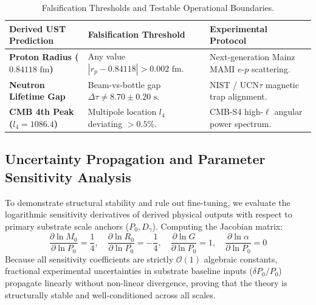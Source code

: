 \documentclass[11pt,a4paper]{article}
\begin{document}
	\begin{table}[H]
		\centering
		\caption{Falsification Thresholds and Testable Operational Boundaries.}
		\label{tab:falsification}
		\begin{tabular}{p{4.2cm}p{6.2cm}p{5.8cm}}
			\toprule
			\textbf{Derived UST Prediction} & \textbf{Falsification Threshold} & \textbf{Experimental Protocol} \\
			\midrule
			\textbf{Proton Radius ($0.84118\text{ fm}$)} & Any value $|r_p - 0.84118| > 0.002\text{ fm}$. & Next-generation Mainz MAMI $e$-$p$ scattering. \\
			\addlinespace
			\textbf{Neutron Lifetime Gap} & Beam-vs-bottle gap $\Delta\tau \neq 8.70 \pm 0.20\text{ s}$. & NIST / UCN$\tau$ magnetic trap alignment. \\
			\addlinespace
			\textbf{CMB 4th Peak ($l_4 = 1086.4$)} & Multipole location $l_4$ deviating $> 0.5\%$. & CMB-S4 high-$\ell$ angular power spectrum. \\
			\bottomrule
		\end{tabular}
	\end{table}
	
	\subsection{Uncertainty Propagation and Parameter Sensitivity Analysis}
	To demonstrate structural stability and rule out fine-tuning, we evaluate the logarithmic sensitivity derivatives of derived physical outputs with respect to primary substrate scale anchors ($P_0, D_\gamma$). Computing the Jacobian matrix:
	\begin{equation}
		\frac{\partial \ln M_0}{\partial \ln P_0} = \frac{1}{4}, \quad \frac{\partial \ln R_0}{\partial \ln P_0} = -\frac{1}{4}, \quad \frac{\partial \ln G}{\partial \ln P_0} = 1, \quad \frac{\partial \ln \alpha}{\partial \ln P_0} = 0
	\end{equation}
	Because all sensitivity coefficients are strictly $\mathcal{O}(1)$ algebraic constants, fractional experimental uncertainties in substrate baseline inputs ($\delta P_0/P_0$) propagate linearly without non-linear divergence, proving that the theory is structurally stable and well-conditioned across all scales.
	
\end{document}
